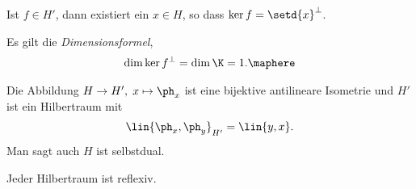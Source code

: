 \begin{bem}[Diskussion.]
\label{bem:5.17}
\begin{bemenum}
  \item Ist $f\in H'$, dann existiert ein $x\in H$, so dass $\ker f =
  \setd{x}^\bot$.
  \item Es gilt die \emph{Dimensionsformel},
\begin{align*}
\dim \ker f^\bot =  \dim\K = 1.\maphere 
\end{align*}
\end{bemenum}
\end{bem}

\begin{cor}
\label{prop:5.18}
\begin{propenum}
  \item Die Abbildung $H\to H',\; x\mapsto \ph_x$ ist eine bijektive
  antilineare Isometrie und $H'$ ist ein Hilbertraum mit
\begin{align*}
\lin{\ph_x,\ph_y}_{H'} = \lin{y,x}.
\end{align*}
Man sagt auch $H$ ist selbstdual.
\item Jeder Hilbertraum ist reflexiv.\fishhere
\end{propenum}
\end{cor}
